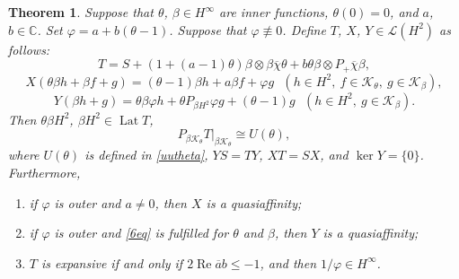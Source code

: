 \documentclass[a4paper,oneside,11pt]{amsart}
\numberwithin{equation}{section}
\theoremstyle{plain}
\newtheorem{theorem}{Theorem}[section]
\theoremstyle{definition}
\begin{document}
\begin{theorem} \label{thm6inv} Suppose that  $\theta$, $\beta\in H^\infty$ are inner functions,  $\theta(0)=0$, and 
$a$, $b\in\mathbb C$.  
Set $\varphi=a+b(\theta-1)$. Suppose that $\varphi\not\equiv 0$. Define $T$, $X$, $Y\in\mathcal L(H^2)$ as follows:
\begin{equation*} T=S+(1+(a-1)\theta)\beta\otimes\beta\overline\chi\theta+b\theta\beta\otimes P_+\overline\chi\beta,
\end{equation*}
\begin{equation*} X(\theta\beta h+\beta f+g)=(\theta-1)\beta h+a\beta f + \varphi g 
\ \ \ (h\in H^2, \ f\in\mathcal K_\theta, \ g\in\mathcal K_\beta),
\end{equation*}
\begin{equation*} Y(\beta h + g)=\theta\beta\varphi h +\theta P_{\beta H^2}\varphi g + (\theta-1)g 
\ \ \ (h\in H^2,  \ g\in\mathcal K_\beta).
\end{equation*}
Then $\theta\beta H^2$,  $\beta H^2\in\operatorname{Lat}T$, 
\begin{equation}\label{6uucong}P_{\beta\mathcal K_\theta}T|_{\beta\mathcal K_\theta}\cong U(\theta),\end{equation} 
where $U(\theta)$ is defined in \eqref{uutheta}, $YS=TY$, $XT=SX$, and $\ker Y=\{0\}$. 
Furthermore, \begin{enumerate}[\upshape (i)]

\item if $\varphi$ is outer and $a\neq 0$, then $X$ is a quasiaffinity;

\item if $\varphi$ is outer and \eqref{6eq} is fulfilled for $\theta$ and $\beta$, then $Y$ is a quasiaffinity;

\item $T$ is expansive if and only if $2\operatorname{Re}\overline ab\leq -1$, and then $1/\varphi\in H^\infty$. 
\end{enumerate}
\end{theorem}
\end{document}
